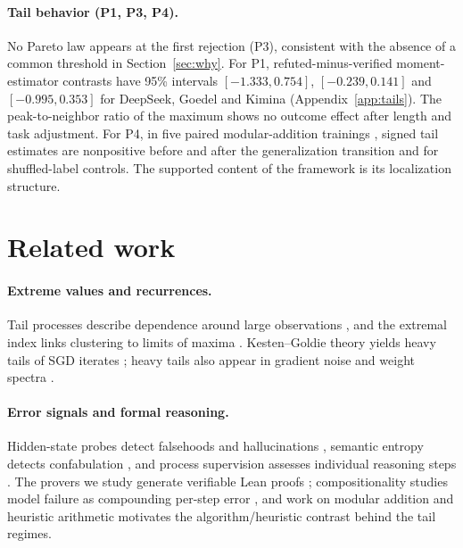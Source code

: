 \paragraph{Tail behavior (P1, P3, P4).} No Pareto law appears at the first rejection (P3), consistent with the absence of a common threshold in Section~\ref{sec:why}. For P1, refuted-minus-verified moment-estimator contrasts have 95\% intervals $[-1.333, 0.754]$, $[-0.239, 0.141]$ and $[-0.995, 0.353]$ for DeepSeek, Goedel and Kimina (Appendix~\ref{app:tails}). The peak-to-neighbor ratio of the maximum shows no outcome effect after length and task adjustment. For P4, in five paired modular-addition trainings \citep{nanda2023}, signed tail estimates are nonpositive before and after the generalization transition and for shuffled-label controls. The supported content of the framework is its localization structure.

\section{Related work}

\paragraph{Extreme values and recurrences.} Tail processes describe dependence around large observations \citep{basrak2009,kulik2020}, and the extremal index links clustering to limits of maxima \citep{leadbetter1983}. Kesten--Goldie theory \citep{kesten1973,goldie1991,buraczewski2016} yields heavy tails of SGD iterates \citep{gurbuzbalaban2021,hodgkinson2021}; heavy tails also appear in gradient noise \citep{simsekli2019} and weight spectra \citep{martin2021}.

\paragraph{Error signals and formal reasoning.} Hidden-state probes detect falsehoods and hallucinations \citep{azaria2023,orgad2025}, semantic entropy detects confabulation \citep{farquhar2024}, and process supervision assesses individual reasoning steps \citep{lightman2024}. The provers we study generate verifiable Lean proofs \citep{ren2025,lin2025,wang2025}; compositionality studies model failure as compounding per-step error \citep{dziri2023,saparov2023}, and work on modular addition \citep{nanda2023} and heuristic arithmetic \citep{nikankin2025} motivates the algorithm/heuristic contrast behind the tail regimes.

